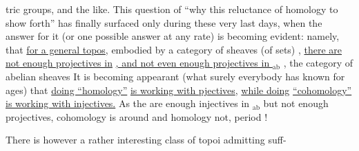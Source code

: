 tric groups,  and the like.  This question of ``why this reluctance of
homology to show forth''  has finally  surfaced only during these very
last days,  when the answer for it (or one possible answer at any rate) is
becoming evident:  namely,  that \uline{for a general topos},  embodied by a
category of sheaves (of sets)  ,  \uline{there are not enough projectives in}
\uline{ ,  and not even enough projectives in $_{\mathrm{ab}}$} ,  the category of abelian
sheaves  It is becoming appearant (what surely everybody has known for
ages)  that  \uline{doing ``homology''} \uline{is working with pjectives},  \uline{while doing}
\uline{``cohomology'' is working with injectives.}  As the are enough injectives
in $_{\mathrm{ab}}$  but not enough projectives,  cohomology is around and homology
not,  period !

There is however a rather interesting class of topoi admitting suff-%

